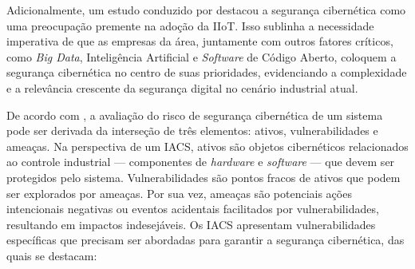     Adicionalmente, um estudo conduzido por  destacou a segurança cibernética como uma preocupação premente na adoção da IIoT. Isso sublinha a necessidade imperativa de que as empresas da área, juntamente com outros fatores críticos, como \textit{Big Data}, Inteligência Artificial e \textit{Software} de Código Aberto, coloquem a segurança cibernética no centro de suas prioridades, evidenciando a complexidade e a relevância crescente da segurança digital no cenário industrial atual.

    De acordo com , a avaliação do risco de segurança cibernética de um sistema pode ser derivada da interseção de três elementos: ativos, vulnerabilidades e ameaças. Na perspectiva de um IACS, ativos são objetos cibernéticos relacionados ao controle industrial — componentes de \textit{hardware} e \textit{software} — que devem ser protegidos pelo sistema. Vulnerabilidades são pontos fracos de ativos que podem ser explorados por ameaças. Por sua vez, ameaças são potenciais ações intencionais negativas ou eventos acidentais facilitados por vulnerabilidades, resultando em impactos indesejáveis. Os IACS apresentam vulnerabilidades específicas que precisam ser abordadas para garantir a segurança cibernética, das quais se destacam:

